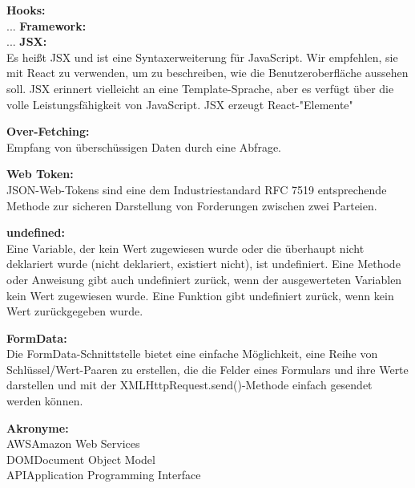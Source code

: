 

\textbf{Hooks:}\\
...
\textbf{Framework:}\\
...
\textbf{JSX:}\\
Es heißt JSX und ist eine Syntaxerweiterung für JavaScript. Wir empfehlen, sie mit React zu verwenden, um zu beschreiben, wie die Benutzeroberfläche aussehen soll. JSX erinnert vielleicht an eine Template-Sprache, aber es verfügt über die volle Leistungsfähigkeit von JavaScript. JSX erzeugt React-"Elemente"

\textbf{Over-Fetching:}\\
Empfang von überschüssigen Daten durch eine Abfrage.

\textbf{Web Token:}\\
JSON-Web-Tokens sind eine dem Industriestandard RFC 7519 entsprechende Methode zur sicheren Darstellung von Forderungen zwischen zwei Parteien.

\textbf{undefined:}\\
Eine Variable, der kein Wert zugewiesen wurde oder die überhaupt nicht deklariert wurde (nicht deklariert, existiert nicht), ist undefiniert. Eine Methode oder Anweisung gibt auch undefiniert zurück, wenn der ausgewerteten Variablen kein Wert zugewiesen wurde. Eine Funktion gibt undefiniert zurück, wenn kein Wert zurückgegeben wurde.

\textbf{FormData:}\\
Die FormData-Schnittstelle bietet eine einfache Möglichkeit, eine Reihe von Schlüssel/Wert-Paaren zu erstellen, die die Felder eines Formulars und ihre Werte darstellen und mit der XMLHttpRequest.send()-Methode einfach gesendet werden können.

\textbf{Akronyme:}\\

{AWS}{Amazon Web Services}\\
{DOM}{Document Object Model}\\
{API}{Application Programming Interface}\\

